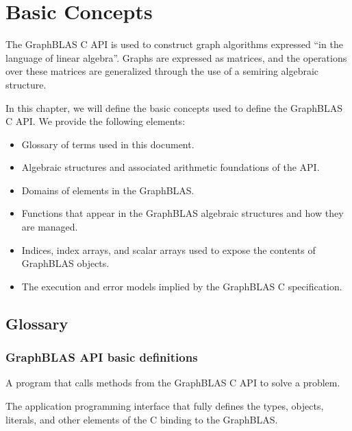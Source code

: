 \chapter{Basic Concepts}
\label{Chp:Concepts}

The GraphBLAS C API is used to construct  
graph algorithms expressed ``in the language of linear algebra''.
Graphs are expressed as matrices, and the operations over 
these matrices are generalized through the use of a
semiring algebraic structure.

In this chapter, we will define the basic concepts used to
define the GraphBLAS C API.  We provide the following elements:
\begin{itemize}
\item Glossary of terms used in this document.  

\item Algebraic structures and associated arithmetic foundations of the API.

\item Domains of  elements in the GraphBLAS.  

\item Functions that appear in the GraphBLAS algebraic 
structures and how they are managed.

\item Indices, index arrays, and scalar arrays used
to expose the contents of GraphBLAS objects.  

\item The execution and error models implied by the GraphBLAS C specification.

\end{itemize}

\section{Glossary}

\subsection{GraphBLAS API basic definitions}

\glossBegin

 A program that calls methods from the GraphBLAS C API to
solve a problem.

 The application programming interface that fully defines the types, objects, 
literals, and other elements of the C binding to the GraphBLAS.

